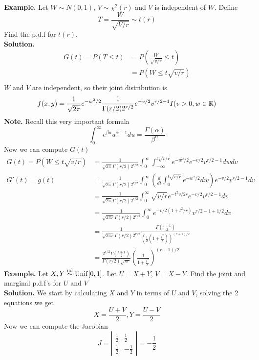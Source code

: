\documentclass[openany]{report}
\begin{document}
    \textbf{Example.} Let $W \sim N(0,1)$, $V \sim \chi^2(r)$ and $V$ is independent of $W$. Define 
    \[T = \frac{W}{\sqrt{V/r}} \sim t(r)\]
    Find the p.d.f for $t(r)$.\\[2ex]
    \textbf{Solution.}
    \begin{align*}
        G(t) = P(T \leq t) &= P\left(\frac{W}{\sqrt{v/r}} \leq t\right)\\
        &= P\left(W \leq t\sqrt{v/r}\right)\\
    \end{align*}
    $W$ and $V$ are independent, so their joint distribution is 
    \[f(x,y) = \frac{1}{\sqrt{2\pi}}e^{-w^2/2} \frac{1}{\Gamma(r/2)2^{r/2}}e^{-v/2}v^{r/2 - 1}I(v > 0, w \in \mathbb{R})\]
    \textbf{Note.} Recall this very important formula
    \[\int_0^\infty e^{\beta u} u^{\alpha - 1}du = \frac{\Gamma(\alpha)}{\beta^\alpha}\]
    Now we can compute $G(t)$ 
    \begin{align*}
        G(t) = P(W \leq t\sqrt{v/r}) &= \frac{1}{\sqrt{2\pi}\Gamma(r/2)2^{r/2}}\int_0^\infty\int_{-\infty}^{t\sqrt{v/r}} e^{-w^2/2}e^{-v/2}v^{r/2 - 1}dwdv\\
        G'(t) = g(t) &= \frac{1}{\sqrt{2\pi}\Gamma(r/2)2^{r/2}}\int_0^\infty \left(\frac{d}{dt}\int_0^{t\sqrt{v/r}} e^{-w^2/2}dw\right)e^{-v/2}v^{r/2 - 1}dv\\
        &= \frac{1}{\sqrt{2\pi}\Gamma(r/2)2^{r/2}} \int_0^\infty \sqrt{v/r} e^{-t^2v/2r}e^{-v/2}v^{r/2 - 1}dv\\
        &= \frac{1}{\sqrt{2\pi r}\Gamma(r/2)2^{r/2}}\int_0^\infty e^{-v/2(1 + t^2/r)}v^{r/2 - 1 + 1/2}dv\\
        &= \frac{1}{\sqrt{2\pi r}\Gamma(r/2)2^{r/2}}\frac{\Gamma\left(\frac{r+1}{2}\right)}{\left(\frac{1}{2}\left(1 + \frac{t^2}{r}\right)\right)^{(r+1)/2}}\\
        &= \frac{2^{r/2}\Gamma\left(\frac{r+1}{2}\right)}{\Gamma(r/2)\sqrt{\pi r}}\left(\frac{1}{1+\frac{t^2}{r}}\right)^{(r+1)/2}
    \end{align*}
    \textbf{Example.} Let $X,Y \overset{\mathrm{iid}}{\sim} \operatorname{Unif}[0,1]$. Let $U = X + Y$, $V = X - Y$. Find the joint and marginal p.d.f's for $U$ and $V$\\[2ex]
    \textbf{Solution.} We start by calculating $X$ and $Y$ in terms of $U$ and $V$, solving the 2 equations we get
    \[X = \frac{U + V}{2}, Y = \frac{U - V}{2}\]
    Now we can compute the Jacobian 
    \[J = \left|\begin{matrix}
        \frac{1}{2} & \frac{1}{2}\\
        \frac{1}{2} & -\frac{1}{2}
    \end{matrix}\right| = -\frac{1}{2}\]
\end{document}
